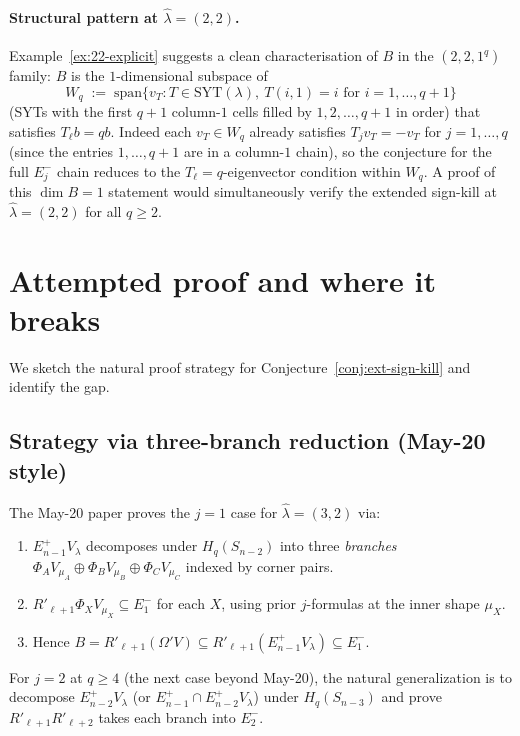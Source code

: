\documentclass[11pt]{article}
\theoremstyle{definition}
\newcommand{\Vlam}{V_\lambda}
\newcommand{\Om}{\Omega}
\newcommand{\hatl}{\widehat\lambda}
\begin{document}
\paragraph{Structural pattern at $\hatl = (2, 2)$.}  Example~\ref{ex:22-explicit}
suggests a clean characterisation of $B$ in the $(2, 2, 1^q)$ family:
$B$ is the $1$-dimensional subspace of
\[
   W_q \;:=\; \mathrm{span}\!\bigl\{ v_T : T \in \mathrm{SYT}(\lambda),\
      T(i, 1) = i \text{ for } i = 1, \ldots, q + 1 \bigr\}
\]
(SYTs with the first $q + 1$ column-$1$ cells filled by $1, 2,
\ldots, q + 1$ in order) that satisfies $T_\ell b = q b$.
Indeed each $v_T \in W_q$ already satisfies $T_j v_T = -v_T$ for
$j = 1, \ldots, q$ (since the entries $1, \ldots, q + 1$ are in a
column-$1$ chain), so the conjecture for the full $E_j^-$ chain
reduces to the $T_\ell = q$-eigenvector condition within $W_q$.  A
proof of this $\dim B = 1$ statement would simultaneously verify
the extended sign-kill at $\hatl = (2, 2)$ for all $q \ge 2$.

\section{Attempted proof and where it breaks}\label{sec:proof-attempt}

We sketch the natural proof strategy for Conjecture~\ref{conj:ext-sign-kill}
and identify the gap.

\subsection{Strategy via three-branch reduction (May-20 style)}

The May-20 paper proves the $j = 1$ case for $\hatl = (3, 2)$ via:
\begin{enumerate}[label=(\arabic*),topsep=0.2em,itemsep=0.1em]
\item $E_{n-1}^+ \Vlam$ decomposes under $H_q(S_{n-2})$ into three
\emph{branches} $\Phi_A V_{\mu_A} \oplus \Phi_B V_{\mu_B} \oplus
\Phi_C V_{\mu_C}$ indexed by corner pairs.
\item $R'_{\ell+1} \Phi_X V_{\mu_X} \subseteq E_1^-$ for each $X$,
using prior $j$-formulas at the inner shape $\mu_X$.
\item Hence $B = R'_{\ell+1}(\Om' V) \subseteq R'_{\ell+1} (E_{n-1}^+
\Vlam) \subseteq E_1^-$.
\end{enumerate}

For $j = 2$ at $q \ge 4$ (the next case beyond May-20), the natural
generalization is to decompose $E_{n-2}^+ \Vlam$ (or
$E_{n-1}^+ \cap E_{n-2}^+ \Vlam$) under $H_q(S_{n-3})$ and prove
$R'_{\ell+1} R'_{\ell+2}$ takes each branch into $E_2^-$.
\end{document}
